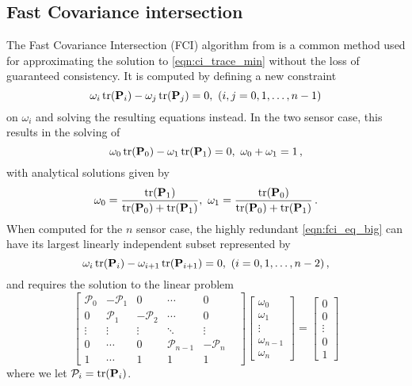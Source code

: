 \documentclass[letterpaper, 10 pt, conference]{ieeeconf}  %
\begin{document}
\subsection{Fast Covariance intersection}
The Fast Covariance Intersection (FCI) algorithm from \cite{niehsenInformationFusionBased2002} is a common method used for approximating the solution to \eqref{eqn:ci_trace_min} without the loss of guaranteed consistency. It is computed by defining a new constraint
\begin{equation}
   \omega_i \operatorname{tr}({{\mathbf{P}}}_i) - \omega_j \operatorname{tr}({{\mathbf{P}}}_j) = 0,\ (i,j=0,1,\dots,n-1) \label{eqn:fci_eq_big}
\end{equation}
on $\omega_i$ and solving the resulting equations instead. In the two sensor case, this results in the solving of
\begin{equation}
   \omega_0 \operatorname{tr}({{\mathbf{P}}}_0) - \omega_1 \operatorname{tr}({{\mathbf{P}}}_1) = 0,\ \omega_0 + \omega_1 = 1\,, \label{eqn:fci_2sen_omega_sum_eq}
\end{equation}
with analytical solutions given by
\begin{equation}
   \omega_0 = \frac{\operatorname{tr}({{\mathbf{P}}}_1)}{\operatorname{tr}({{\mathbf{P}}}_0)+\operatorname{tr}({{\mathbf{P}}}_1)},\ \omega_1 = \frac{\operatorname{tr}({{\mathbf{P}}}_0)}{\operatorname{tr}({{\mathbf{P}}}_0)+\operatorname{tr}({{\mathbf{P}}}_1)}\,. \label{eqn:fci_2sen_sol}
\end{equation}
When computed for the $n$ sensor case, the highly redundant \eqref{eqn:fci_eq_big} can have its largest linearly independent subset represented by
\begin{equation}
   \omega_i \operatorname{tr}({{\mathbf{P}}}_i) - \omega_{i+1} \operatorname{tr}({{\mathbf{P}}}_{i+1}) = 0,\ (i=0,1,\dots,n-2)\,, \label{eqn:fci_eq}
\end{equation}
and requires the solution to the linear problem
\begin{equation}
   \begin{bmatrix}
      \mathcal{P}_0 & -\mathcal{P}_1 & 0 & \cdots & 0 \\
      0 & \mathcal{P}_1 & -\mathcal{P}_2 & \cdots & 0 \\
      \vdots & \vdots & \vdots & \ddots & \vdots & \\
      0 & \cdots & 0 & \mathcal{P}_{n-1} & -\mathcal{P}_n \\
      1 & \cdots & 1 & 1 & 1 &
   \end{bmatrix}
   \begin{bmatrix}
      \omega_0 \\
      \omega_1 \\
      \vdots \\
      \omega_{n-1} \\
      \omega_n
   \end{bmatrix}
   =
   \begin{bmatrix}
      0 \\
      0 \\
      \vdots \\
      0 \\
      1
   \end{bmatrix} \label{eqn:fci_eq_sys}
\end{equation}
where we let $\mathcal{P}_i = \operatorname{tr}({{\mathbf{P}}}_i)$.
\end{document}
